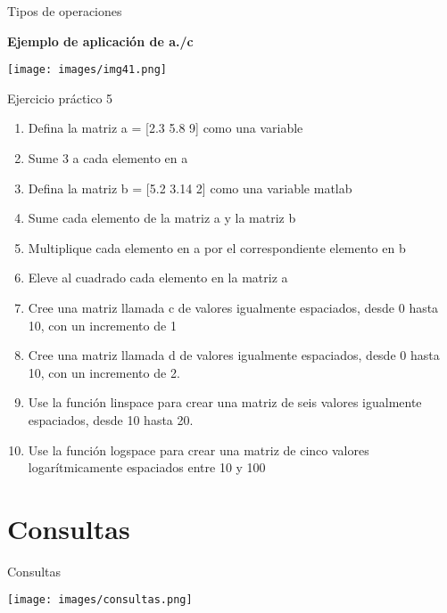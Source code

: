 \documentclass{bredelebeamer}
\begin{document}
\begin{frame}{Tipos de operaciones}
\begin{center}
\textbf{Ejemplo de aplicación de a./c}
\end{center}
\begin{center}
\texttt{[image: images/img41.png]}
\end{center}
\end{frame}

\begin{frame}{Ejercicio práctico 5}
\begin{enumerate}
\item Defina la matriz a = [2.3 5.8 9] como una variable
\item Sume 3 a cada elemento en a
\item Defina la matriz b = [5.2 3.14 2] como una variable matlab
\item Sume cada elemento de la matriz a y la matriz b
\item Multiplique cada elemento en a por el correspondiente elemento en b
\item Eleve al cuadrado cada elemento en la matriz a
\item Cree una matriz llamada c de valores igualmente espaciados, desde 0 hasta 10, con un incremento de 1
\item Cree una matriz llamada d de valores igualmente espaciados, desde 0 hasta 10, con un incremento de 2.
\item Use la función linspace para crear una matriz de seis valores igualmente espaciados, desde 10 hasta 20.
\item Use la función logspace para crear una matriz de cinco valores logarítmicamente espaciados entre 10 y 100
\end{enumerate}
\end{frame}




\section{Consultas}
\begin{frame}{Consultas}
\begin{center}
\texttt{[image: images/consultas.png]}
\end{center}
\end{frame}
\end{document}
